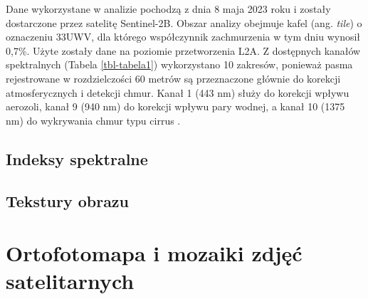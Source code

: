 \documentclass{amuthesis}
\begin{document}
Dane wykorzystane w analizie pochodzą z dnia 8 maja 2023 roku i zostały
dostarczone przez satelitę Sentinel-2B. Obszar analizy obejmuje kafel
(ang. \emph{tile}) o oznaczeniu 33UWV, dla którego współczynnik
zachmurzenia w tym dniu wynosił 0,7\%. Użyte zostały dane na poziomie
przetworzenia L2A. Z dostępnych kanałów spektralnych (Tabela
\ref{tbl-tabela1}) wykorzystano 10 zakresów, ponieważ pasma rejestrowane
w rozdzielczości 60 metrów są przeznaczone głównie do korekcji
atmosferycznych i detekcji chmur. Kanał 1 (443 nm) służy do korekcji
wpływu aerozoli, kanał 9 (940 nm) do korekcji wpływu pary wodnej, a
kanał 10 (1375 nm) do wykrywania chmur typu cirrus
\autocite{drusch_2012_sen2GMES}.

\hypertarget{indeksy-spektralne}{%
\subsection{Indeksy spektralne}\label{indeksy-spektralne}}

\hypertarget{tekstury-obrazu}{%
\subsection{Tekstury obrazu}\label{tekstury-obrazu}}

\hypertarget{sec-mosaics}{%
\section{Ortofotomapa i mozaiki zdjęć satelitarnych}\label{sec-mosaics}}
\end{document}
